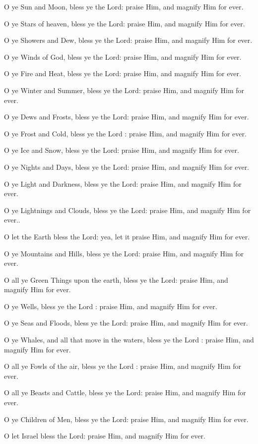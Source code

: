 O ye Sun and Moon, bless ye the Lord: praise Him, and magnify Him for ever.

O ye Stars of heaven, bless ye the Lord: praise Him, and magnify Him for ever.

O ye Showers and Dew, bless ye the Lord: praise Him, and magnify Him for ever. 

O ye Winds of God, bless ye the Lord: praise Him, and magnify Him for ever.

O ye Fire and Heat, bless ye the Lord: praise Him, and magnify Him for ever.

O ye Winter and Summer, bless ye the Lord: praise Him, and magnify Him for ever.

O ye Dews and Frosts, bless ye the Lord: praise Him, and magnify Him for ever.

O ye Frost and Cold, bless ye the Lord : praise Him, and magnify Him for ever.

O ye Ice and Snow, bless ye the Lord: praise Him, and magnify Him for ever.

O ye Nights and Days, bless ye the Lord: praise Him, and magnify Him for ever.

O ye Light and Darkness, bless ye the Lord: praise Him, and magnify Him for ever.

O ye Lightnings and Clouds, bless ye the Lord: praise Him, and magnify Him for ever..

O let the Earth bless the Lord: yea, let it praise Him, and magnify Him for ever.

O ye Mountains and Hills, bless ye the Lord: praise Him, and magnify Him for ever.

O all ye Green Things upon the earth, bless ye the Lord: praise Him, and magnify Him for ever.

O ye Wells, bless ye the Lord : praise Him, and magnify Him for ever.

O ye Seas and Floods, bless ye the Lord: praise Him, and magnify Him for ever.

O ye Whales, and all that move in the waters, bless ye the Lord : praise Him, and magnify Him for ever.

O all ye Fowls of the air, bless ye the Lord : praise Him, and magnify Him for ever.

O all ye Beasts and Cattle, bless ye the Lord: praise Him, and magnify Him for ever.

O ye Children of Men, bless ye the Lord: praise Him, and magnify Him for ever.

O let Israel bless the Lord: praise Him, and magnify Him for ever.

